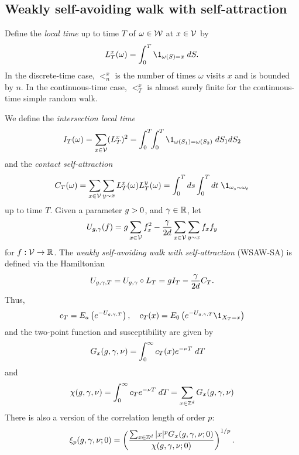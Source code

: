 
\subsection{Weakly self-avoiding walk with self-attraction}

Define the \emph{local time} up to time $T$ of $\omega \in \mathcal{W}$ at
$x \in \mathcal{V}$ by
\begin{equation}
\label{e:LTx-def}
\lt^x_T(\omega) = \int_0^T \1_{\omega(S)=x} \; dS.
\end{equation}
In the discrete-time case, $\lt^x_n$ is the number of times $\omega$ visits $x$
and is bounded by $n$. In the continuous-time case, $\lt^x_T$ is almost surely
finite for the continuous-time simple random walk.

We define the \emph{intersection local time}
\begin{equation}
\label{e:ITdef}
I_T(\omega) = \sum_{x\in\vertices} (\lt^x_T)^2
  =
\int_0^T \!\! \int_0^T \1_{\omega(S_1)=\omega(S_2)} \; dS_1 dS_2
\end{equation}
and the \emph{contact self-attraction}
\begin{equation}
\label{e:CTdef}
C_T(\omega)
	=
\sum_{x \in \vertices} \sum_{y \sim x} \lt_T^x(\omega) \lt_T^y(\omega)
	=
\int_0^T ds \int_0^T dt \; \1_{\omega_s \sim \omega_t}
\end{equation}
up to time $T$.
Given a parameter $g > 0$, and $\gamma \in {\mathbb R}$, let
\begin{equation}
\label{e:Udef-neg}
U_{g,\gamma}(f)
=
g \sum_{x\in\mathcal{V}} f_x^2
- \frac{\gamma}{2d}
\sum_{x\in\mathcal{V}} \sum_{y \sim x} f_x f_y
\end{equation}
for $f : \mathcal{V} \rightarrow {\mathbb R}$.
The \emph{weakly self-avoiding walk with self-attraction} (WSAW-SA) is defined via the Hamiltonian
\begin{equation}
\label{e:V}
U_{g,\gamma,T}
	= U_{g,\gamma} \circ L_T
	= g I_T - \frac{\gamma}{2 d} C_T.
\end{equation}
Thus,
\begin{equation}
\label{e:c}
    c_T = E_a\left(e^{-U_{\gcc,\gamma,T}}\right),
    \quad
    c_T(x) = E_0\left(e^{-U_{\gcc,\gamma,T}}\1_{X_T = x}\right)
\end{equation}
and the two-point function and susceptibility are given by
\begin{align}
\lbeq{Gsa}
G_x(\gcc,\gamma,\nu)
    &=
\int_0^\infty c_T(x) e^{-\nu T} \; dT
\end{align}
and
\begin{equation}
\label{e:suscept-def}
\chi(g, \gamma, \nu)
	=
\int_0^\infty c_T e^{-\nu T} \; dT
	=
\sum_{x\in{ {{\mathbb Z}}^d }} G_x(g,\gamma,\nu)
\end{equation}
There is also a version of the correlation length of order $p$:
\begin{equation}
\label{e:clp-wsawsa}
\xi_p(g, \gamma, \nu; 0)
	=
\left(\frac{\sum_{x\in{ {{\mathbb Z}}^d }} |x|^p G_x(g, \gamma, \nu; 0)}{\chi(g, \gamma, \nu; 0)}\right)^{1/p}.
\end{equation}

